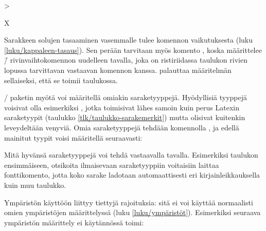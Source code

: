 \begin{koodilohkosis}
>{\raggedright\arraybackslash}X
\end{koodilohkosis}

\noindent
Sarakkeen solujen tasaaminen vasemmalle tulee komennon
 vaikutuksesta (luku \ref{luku/kappaleen-tasaus}).
Sen perään tarvitaan myös komento , koska
 määrittelee \komento{\keno}\=/ rivinvaihtokomennon
uudelleen tavalla, joka on ristiriidassa taulukon rivien lopussa
tarvittavan vastaavan komennon kanssa. 
palauttaa määritelmän sellaiseksi, että se toimii taulukossa.

\-/ paketin myötä voi määritellä omiakin
saraketyyppejä. Hyödyllisiä tyyppejä voisivat olla esimerkiksi
, jotka toimisivat lähes samoin kuin perus Latexin
saraketyypit  (taulukko \ref{tlk/taulukko-sarakemerkit})
mutta olisivat kuitenkin leveydeltään venyviä. Omia saraketyyppejä
tehdään komennolla , ja edellä mainitut tyypit
voisi määritellä seuraavasti:

\begin{koodilohkosis}
\end{koodilohkosis}

\noindent
Mitä hyvänsä saraketyyppejä voi tehdä vastaavalla tavalla. Esimerkiksi
taulukon ensimmäiseen, otsikoita ilmaisevaan saraketyyppiin 
voitaisiin laittaa fonttikomento, jotta koko sarake ladotaan
automaattisesti eri kirjainleikkauksella kuin muu taulukko.

\begin{koodilohkosis}
\end{koodilohkosis}

\noindent
Ympäristön  käyttöön liittyy tiettyjä rajoituksia:
sitä ei voi käyttää normaalisti omien ympäristöjen määrittelyssä (luku
\ref{luku/ympäristöt}). Esimerkiksi seuraava ympäristön määrittely ei
käytännössä toimi:

\begin{koodilohkosis}
\newenvironment{omataulukko}[1]
{\begin{tabularx}{\linewidth}{#1}}
{\end{tabularx}}
\end{koodilohkosis}

